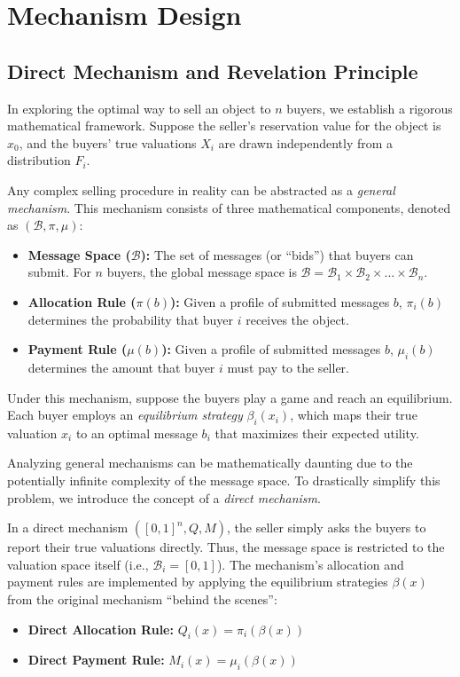 \chapter{Mechanism Design}

\section{Direct Mechanism and Revelation Principle}

In exploring the optimal way to sell an object to $n$ buyers, we establish a rigorous mathematical framework. Suppose the seller's reservation value for the object is $x_0$, and the buyers' true valuations $X_i$ are drawn independently from a distribution $F_i$.

Any complex selling procedure in reality can be abstracted as a \textit{general mechanism}. This mechanism consists of three mathematical components, denoted as $(\mathcal{B}, \pi, \mu)$:
\begin{itemize}
    \item \textbf{Message Space ($\mathcal{B}$):} The set of messages (or ``bids'') that buyers can submit. For $n$ buyers, the global message space is $\mathcal{B} = \mathcal{B}_1 \times \mathcal{B}_2 \times \dots \times \mathcal{B}_n$.
    \item \textbf{Allocation Rule ($\pi(b)$):} Given a profile of submitted messages $b$, $\pi_i(b)$ determines the probability that buyer $i$ receives the object.
    \item \textbf{Payment Rule ($\mu(b)$):} Given a profile of submitted messages $b$, $\mu_i(b)$ determines the amount that buyer $i$ must pay to the seller.
\end{itemize}
Under this mechanism, suppose the buyers play a game and reach an equilibrium. Each buyer employs an \textit{equilibrium strategy} $\beta_i(x_i)$, which maps their true valuation $x_i$ to an optimal message $b_i$ that maximizes their expected utility.

Analyzing general mechanisms can be mathematically daunting due to the potentially infinite complexity of the message space. To drastically simplify this problem, we introduce the concept of a \textit{direct mechanism}.

In a direct mechanism $([0,1]^n, Q, M)$, the seller simply asks the buyers to report their true valuations directly. Thus, the message space is restricted to the valuation space itself (i.e., $\mathcal{B}_i = [0,1]$). The mechanism's allocation and payment rules are implemented by applying the equilibrium strategies $\beta(x)$ from the original mechanism ``behind the scenes'':
\begin{itemize}
    \item \textbf{Direct Allocation Rule:} $Q_i(x) = \pi_i(\beta(x))$
    \item \textbf{Direct Payment Rule:} $M_i(x) = \mu_i(\beta(x))$
\end{itemize}

